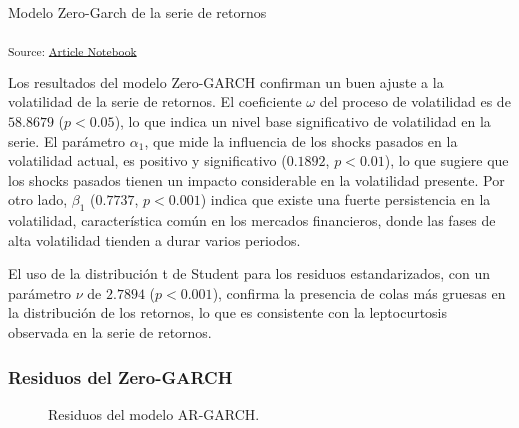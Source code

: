 \documentclass[
  number,
  preprint,
  3p,
  onecolumn]{elsarticle}
\begin{document}
Modelo Zero-Garch de la serie de retornos

\textsubscript{Source:
\href{https://iancont.github.io/fixed_income_garch/index-preview.html}{Article
Notebook}}

Los resultados del modelo Zero-GARCH confirman un buen ajuste a la
volatilidad de la serie de retornos. El coeficiente \(\omega\) del
proceso de volatilidad es de \(58.8679\) (\(p < 0.05\)), lo que indica
un nivel base significativo de volatilidad en la serie. El parámetro
\(\alpha_1\), que mide la influencia de los shocks pasados en la
volatilidad actual, es positivo y significativo (\(0.1892\),
\(p < 0.01\)), lo que sugiere que los shocks pasados tienen un impacto
considerable en la volatilidad presente. Por otro lado, \(\beta_1\)
(\(0.7737\), \(p < 0.001\)) indica que existe una fuerte persistencia en
la volatilidad, característica común en los mercados financieros, donde
las fases de alta volatilidad tienden a durar varios periodos.

El uso de la distribución t de Student para los residuos estandarizados,
con un parámetro \(\nu\) de \(2.7894\) (\(p < 0.001\)), confirma la
presencia de colas más gruesas en la distribución de los retornos, lo
que es consistente con la leptocurtosis observada en la serie de
retornos.

\subsubsection{Residuos del Zero-GARCH}\label{residuos-del-zero-garch}

\begin{figure}[H]


\caption{\label{fig-garch-residuals}Residuos del modelo AR-GARCH.}

\end{figure}%
\end{document}
